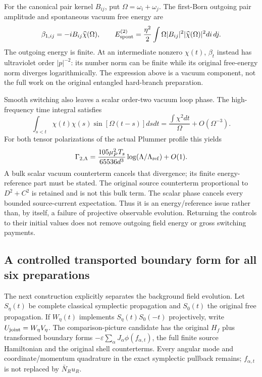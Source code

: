 For the canonical pair kernel $B_{ij}$, put $\Omega=\omega_i+\omega_j$.
The first-Born outgoing pair amplitude and spontaneous vacuum free energy are
\[
 \beta_{1,ij}=-iB_{ij}\widehat\chi(\Omega),\qquad
 E_{\rm spont}^{(2)}=\frac{\eta^2}{2}\int\Omega|B_{ij}|^2
                                  |\widehat\chi(\Omega)|^2di\,dj.
\]
The outgoing energy is finite. At an intermediate nonzero $\chi(t)$,
$\beta_t$ instead has ultraviolet order $|p|^{-2}$: its number norm can
be finite while its original free-energy norm diverges logarithmically.
The expression above is a vacuum component, not the full work on the
original entangled hard-branch preparation.

Smooth switching also leaves a scalar order-two vacuum loop phase.
The high-frequency time integral satisfies
\[
 \int_{s<t}\chi(t)\chi(s)\sin[\Omega(t-s)]dsdt
 =\frac{\int\chi^2dt}{\Omega}+O(\Omega^{-3}).
\]
For both tensor polarizations of the actual Plummer profile this yields
\[
 \Gamma_{2,\Lambda}=
 \frac{105\mu_P^2T_s}{65536d^3}\log(\Lambda/\Lambda_{\rm ref})+O(1).
\]
A bulk scalar vacuum counterterm cancels that divergence; its finite
energy-reference part must be stated. The original source counterterm
proportional to $D^2+C^2$ is retained and is not this bulk term.
The scalar phase cancels every bounded source-current expectation. Thus
it is an energy/reference issue rather than, by itself, a failure of
projective observable evolution. Returning the controls to their initial
values does not remove outgoing field energy or gross switching payments.

\subsection{A controlled transported boundary form for all six preparations}
The next construction explicitly separates the background field evolution.
Let $S_\eta(t)$ be complete classical symplectic propagation and $S_0(t)$
the original free propagation. If $W_\eta(t)$ implements
$S_\eta(t)S_0(-t)$ projectively, write $U_{\rm joint}=W_\eta V_\eta$.
The comparison-picture candidate has the original $H_f$ plus transformed
boundary forms $-\varepsilon\sum_\alpha J_\alpha\phi(f_{\alpha,t})$,
the full finite source Hamiltonian and the original shell counterterms.
Every angular mode and coordinate/momentum quadrature in the exact
symplectic pullback remains; $f_{\alpha,t}$ is not replaced by
$\bar N_Ru_R$.

